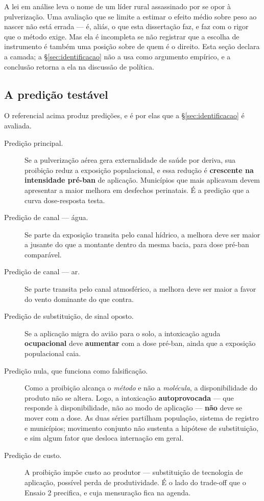 A lei em análise leva o nome de um líder rural assassinado por se opor à
pulverização. Uma avaliação que se limite a estimar o efeito médio sobre peso ao
nascer não está errada --- é, aliás, o que esta dissertação faz, e faz com o rigor
que o método exige. Mas ela é incompleta se não registrar que a escolha de
instrumento é também uma posição sobre de quem é o direito. Esta seção declara a
camada; a §\ref{sec:identificacao} não a usa como argumento empírico, e a
conclusão retorna a ela na discussão de política.

\subsection{A predição testável}
\label{sub:predicao}

O referencial acima produz predições, e é por elas que a §\ref{sec:identificacao}
é avaliada.

\begin{description}
  \item[Predição principal.] Se a pulverização aérea gera externalidade de saúde
    por deriva, sua proibição reduz a exposição populacional, e essa redução é
    \textbf{crescente na intensidade pré-ban} de aplicação. Municípios que mais
    aplicavam devem apresentar a maior melhora em desfechos perinatais. É a
    predição que a curva dose-resposta testa.

  \item[Predição de canal --- água.] Se parte da exposição transita pelo canal
    hídrico, a melhora deve ser maior a jusante do que a montante dentro da mesma
    bacia, para dose pré-ban comparável.

  \item[Predição de canal --- ar.] Se parte transita pelo canal atmosférico, a
    melhora deve ser maior a favor do vento dominante do que contra.

  \item[Predição de substituição, de sinal oposto.] Se a aplicação migra do
    avião para o solo, a intoxicação aguda \textbf{ocupacional} deve
    \textbf{aumentar} com a dose pré-ban, ainda que a exposição populacional
    caia.

  \item[Predição nula, que funciona como falsificação.] Como a proibição alcança
    o \emph{método} e não a \emph{molécula}, a disponibilidade do produto não se
    altera. Logo, a intoxicação \textbf{autoprovocada} --- que responde à
    disponibilidade, não ao modo de aplicação --- \textbf{não} deve se mover com
    a dose. As duas séries partilham população, sistema de registro e municípios;
    movimento conjunto não sustenta a hipótese de substituição, e sim algum fator
    que desloca internação em geral.

  \item[Predição de custo.] A proibição impõe custo ao produtor --- substituição
    de tecnologia de aplicação, possível perda de produtividade. É o lado do
    trade-off que o Ensaio 2 precifica, e cuja mensuração fica na agenda.
\end{description}

